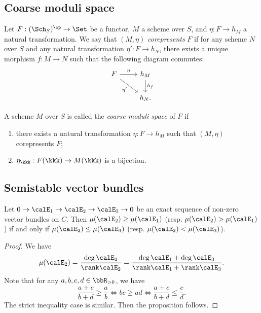 \subsection{Coarse moduli space}


    \begin{definition}\label{def:corepresents_functor}
        Let \(F: (\Sch_S)^{\op} \to \Set\) be a functor, \(M\) a scheme over \(S\), and \(\eta : F \to h_M\) a natural transformation.
        We say that \((M, \eta)\) \emph{corepresents} \(F\) 
        if for any scheme \(N\) over \(S\) and any natural transformation \(\eta' : F \to h_N\), 
        there exists a unique morphism \(f : M \to N\) such that the following diagram commutes:
        \[ \begin{tikzcd}
            F \arrow[r, "\eta"] \arrow[dr, "\eta'"'] & h_M \arrow[d, "h_f"] \\
             & h_N.
        \end{tikzcd} \]
    \end{definition}

    \begin{definition}\label{def:coarse_moduli_space}
        A scheme \(M\) over \(S\) is called the \emph{coarse moduli space} of \(F\) if 
        \begin{enumerate}
            \item there exists a natural transformation \(\eta : F \to h_M\) such that \((M, \eta)\) corepresents \(F\);
            \item \(\eta_\kkk : F(\kkk) \to M(\kkk)\) is a bijection.
        \end{enumerate}
    \end{definition}


\subsection{Semistable vector bundles}

    \begin{proposition}\label{lem:slope_of_exact_sequence}
        Let \(0 \to \calE_1 \to \calE_2 \to \calE_3 \to 0\) be an exact sequence of non-zero vector bundles on \(C\).
        Then \(\mu(\calE_2) \geq \mu(\calE_1)\) (resp. \(\mu(\calE_2) > \mu(\calE_1)\)) if and only if \(\mu(\calE_2) \leq \mu(\calE_3)\) (resp. \(\mu(\calE_2) < \mu(\calE_3)\)).
    \end{proposition}
    \begin{proof}
        We have 
        \[ \mu(\calE_2) = \frac{\deg \calE_2}{\rank \calE_2} = \frac{\deg \calE_1 + \deg \calE_3}{\rank \calE_1 + \rank \calE_3}. \]
        Note that for any \(a,b,c,d \in \bbR_{>0}\), we have 
        \[\frac{a+c}{b+d} \geq \frac{a}{b} \iff bc \geq ad \iff \frac{a+c}{b+d} \leq \frac{c}{d}. \]
        The strict inequality case is similar.
        Then the proposition follows.
    \end{proof}

